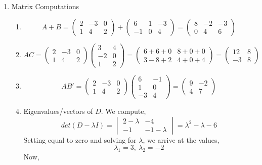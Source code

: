 \documentclass[letterpaper,10pt]{article}
\begin{document}
\begin{enumerate}
\item Matrix Computations
\begin{enumerate}
\item \[A+B=\begin{pmatrix}
2 & -3 & 0 \\
1 & 4 & 2
\end{pmatrix}+\begin{pmatrix}
6 & 1 & -3\\
-1 & 0 & 4
\end{pmatrix}=\begin{pmatrix}
8 & -2 & -3\\
0 & 4 & 6
\end{pmatrix} \]
\item \[AC=\begin{pmatrix}
2 & -3 & 0 \\
1 & 4 & 2
\end{pmatrix}\begin{pmatrix}
3 & 4\\
-2 & 0\\
1 & 2
\end{pmatrix}=\begin{pmatrix}
6+6+0 & 8+0+0\\
3-8+2 & 4+0+4
\end{pmatrix}=\begin{pmatrix}
12 & 8\\
-3 & 8
\end{pmatrix} \]
\item \[AB'=\begin{pmatrix}
2 & -3 & 0 \\
1 & 4 & 2
\end{pmatrix}\begin{pmatrix}
6 & -1\\
1 & 0\\
-3 & 4
\end{pmatrix}=\begin{pmatrix}
9 & -2\\
4 & 7
\end{pmatrix} \]
\item Eigenvalues/vectors of $D$. We compute,
\[det(D-\lambda I)=\begin{vmatrix}
2-\lambda & -4\\
-1 & -1-\lambda
\end{vmatrix}=\lambda^2-\lambda-6 \]
Setting equal to zero and solving for $\lambda$, we arrive at the values,
\[\lambda_1=3,\ \lambda_2=-2\]
Now,
\begin{align*}

\end{align*}
\end{enumerate}
\end{enumerate}
\end{document}
